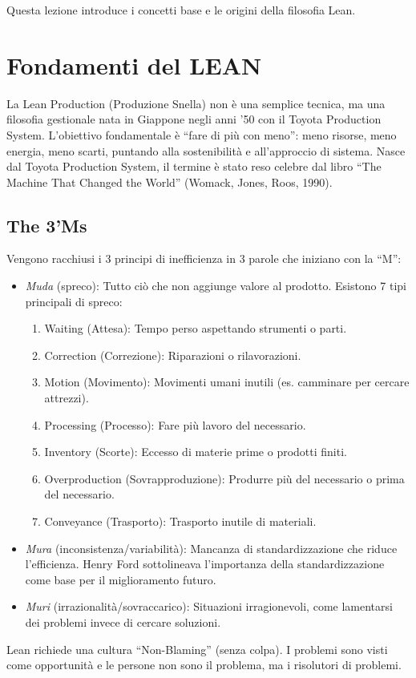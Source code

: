 %
Questa lezione introduce i concetti base e le origini della filosofia Lean.
%
\section{Fondamenti del LEAN}
La Lean Production (Produzione Snella) non è una semplice tecnica, ma una filosofia gestionale nata in Giappone negli anni '50 con il Toyota Production System. L'obiettivo fondamentale è ``fare di più con meno'': meno risorse, meno energia, meno scarti, puntando alla sostenibilità e all'approccio di sistema. Nasce dal Toyota Production System, il termine è stato reso celebre dal libro ``The Machine That Changed the World'' (Womack, Jones, Roos, 1990).
%
\subsection{The 3'Ms}
Vengono racchiusi i 3 principi di inefficienza in 3 parole che iniziano con la ``M'':
\begin{itemize}
    \item \emph{Muda} (spreco): Tutto ciò che non aggiunge valore al prodotto. Esistono 7 tipi principali di spreco:
          \begin{enumerate}
              \item Waiting (Attesa): Tempo perso aspettando strumenti o parti.
              \item Correction (Correzione): Riparazioni o rilavorazioni.
              \item Motion (Movimento): Movimenti umani inutili (es. camminare per cercare attrezzi).
              \item Processing (Processo): Fare più lavoro del necessario.
              \item Inventory (Scorte): Eccesso di materie prime o prodotti finiti.
              \item Overproduction (Sovrapproduzione): Produrre più del necessario o prima del necessario.
              \item Conveyance (Trasporto): Trasporto inutile di materiali.
          \end{enumerate}
    \item \emph{Mura} (inconsistenza/variabilità): Mancanza di standardizzazione che riduce l'efficienza. Henry Ford sottolineava l'importanza della standardizzazione come base per il miglioramento futuro.
    \item \emph{Muri} (irrazionalità/sovraccarico): Situazioni irragionevoli, come lamentarsi dei problemi invece di cercare soluzioni.
\end{itemize}
Lean richiede una cultura ``Non-Blaming'' (senza colpa). I problemi sono visti come opportunità e le persone non sono il problema, ma i risolutori di problemi.
%

